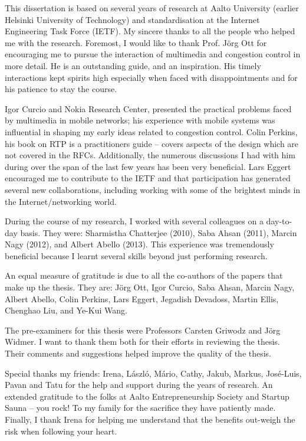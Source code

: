 \documentclass[dissertation,final]{aaltoseries} %
\begin{document}

\begin{preface}[Espoo]

This dissertation is based on several years of research at Aalto University
(earlier Helsinki University of Technology) and standardisation at the
Internet Engineering Task Force (IETF). My sincere thanks to all the people who
helped me with the research. Foremost, I would like to thank Prof. J\"{o}rg Ott
for encouraging me to pursue the interaction of multimedia and congestion
control in more detail. He is an outstanding guide, and an inspiration. His 
timely interactions kept spirits high especially when faced with 
disappointments and for his patience to stay the course.

Igor Curcio and Nokia Research Center, presented the practical problems faced
by multimedia in mobile networks; his experience with mobile systems was
influential in shaping my early ideas related to congestion control.  
%
Colin Perkins, his book on RTP is a practitioners guide -- covers aspects of the
design which are not covered in the RFCs. Additionally, the numerous 
discussions I had with him during over the span of the last few years has been 
very beneficial. 
%
Lars Eggert encouraged me to contribute to the IETF and that participation 
has generated several new collaborations, including working with some of the
brightest minds in the Internet/networking world.

During the course of my research, I worked with several colleagues on a 
day-to-day basis. They were: Sharmistha Chatterjee (2010), Saba Ahsan (2011), 
Marcin Nagy (2012), and Albert Abello (2013). This experience was tremendously 
beneficial because I learnt several skills beyond just performing research.

An equal measure of gratitude is due to all the co-authors of  the papers that
make up the thesis. They are: J\"{o}rg Ott, Igor Curcio, Saba Ahsan, Marcin 
Nagy, Albert Abello, Colin Perkins, Lars Eggert, Jegadish Devadoss,  Martin  
Ellis, Chenghao Liu, and Ye-Kui Wang.

The pre-examiners for this thesis were Professors Carsten Griwodz and J\"{o}rg
Widmer. I want to thank them both for their efforts in reviewing the thesis. 
Their comments and suggestions helped improve the quality of the thesis. 

Special thanks my friends: Irena, L\'{a}szl\'{o}, M\'{a}rio, Cathy, Jakub, 
Markus, Jos\'{e}-Luis, Pavan and Tatu for the help and support during
the years of research. An extended gratitude to the folks at Aalto 
Entrepreneurship Society and Startup Sauna -- you rock! To my family for
the sacrifice they have patiently made. Finally, I thank Irena for helping
me understand that the benefits out-weigh the risk when following your heart.

\end{preface}
\end{document}

